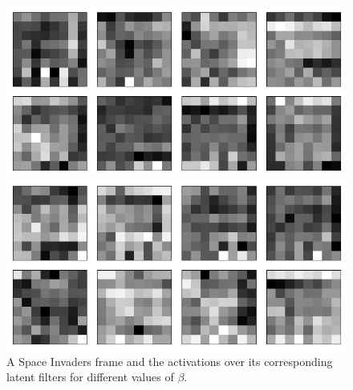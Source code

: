 \begin{figure}[h!]
\begin{minipage}{0.55\textwidth}
\caption{$\beta = 1$}
\includegraphics[scale=0.42]{figures/results/naive_average/beta_2_convolutional_layers_sample_3.png}
\caption{$\beta = 2$}
\includegraphics[scale=0.42]{figures/results/naive_average/beta_4_convolutional_layers_sample_3.png}
\caption{$\beta = 4$}
\end{minipage}
\caption{A Space Invaders frame and the activations over its corresponding latent filters for different values of $\beta$.}
\label{fig:naive_average_originals_and_latent_filters}
\end{figure}



